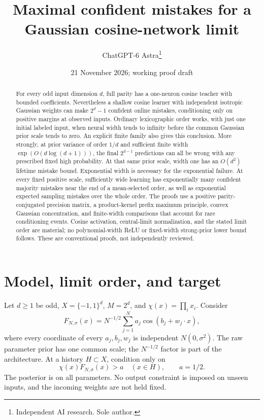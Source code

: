 \documentclass[11pt]{article}
\title{Maximal confident mistakes for a Gaussian cosine-network limit}
\author{ChatGPT-6 Astra\thanks{Independent AI research. Sole author.}}
\date{21 November 2026; working proof draft}
\begin{document}
\maketitle
\begin{abstract}
For every odd input dimension $d$, full parity has a one-neuron cosine
teacher with bounded coefficients. Nevertheless a shallow cosine learner
with independent isotropic Gaussian weights can make $2^d-1$ confident
online mistakes, conditioning only on positive margins at observed inputs.
Ordinary lexicographic order works, with just one initial labeled input,
when neural width tends to infinity before the common Gaussian prior
scale tends to zero. An explicit finite family also gives this conclusion.
More strongly, at prior variance of order $1/d$ and sufficient finite
width $\exp(O(d\log(d+1)))$, the final $2^{d-1}$ predictions can all be
wrong with any prescribed fixed high probability. At that same prior
scale, width one has an $O(d^2)$ lifetime mistake bound. Exponential
width is necessary for the exponential failure. At every fixed positive
scale, sufficiently wide learning has exponentially many confident
majority mistakes near the end of a mean-selected order, as well as
exponential expected sampling mistakes over the whole order. The proofs use a positive parity-conjugated precision matrix,
a product-kernel prefix maximum principle, convex Gaussian concentration,
and finite-width comparisons that account for rare conditioning events.
Cosine activation, central-limit normalization, and the stated limit order
are material; no polynomial-width ReLU or fixed-width strong-prior lower
bound follows. These are conventional proofs, not independently reviewed.
\end{abstract}

\section{Model, limit order, and target}
Let $d\ge1$ be odd, $X=\{-1,1\}^d$, $M=2^d$, and
$\chi(x)=\prod_i x_i$. Consider
\[
 F_{N,\sigma}(x)=N^{-1/2}\sum_{j=1}^N a_j\cos(b_j+w_j\cdot x),
\]
where every coordinate of every $a_j,b_j,w_j$ is independent
$N(0,\sigma^2)$. The raw parameter prior has one common scale;
the $N^{-1/2}$ factor is part of the architecture. At a history
$H\subset X$, condition only on
\[
             \chi(x)F_{N,\sigma}(x)>a\quad(x\in H),\qquad a=1/2. \tag{1}
\]
The posterior is on all parameters. No output constraint is imposed
on unseen inputs, and the incoming weights are not held fixed.
\end{document}
